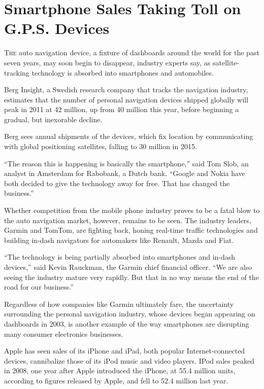﻿\documentclass[12pt]{article}
\begin{document}
\section{Smartphone Sales Taking Toll on G.P.S. Devices}

\lettrine{T}{he} auto navigation device, a fixture of dashboards around the
world for the past seven years, may soon begin to disappear, industry experts say, as
satellite-tracking technology is absorbed into smartphones and automobiles.

Berg Insight, a Swedish research company that tracks the navigation industry, estimates that the
number of personal navigation devices shipped globally will peak in 2011 at 42 million, up from 40
million this year, before beginning a gradual, but inexorable decline.

Berg sees annual shipments of the devices, which fix location by communicating with global
positioning satellites, falling to 30 million in 2015.

``The reason this is happening is basically the smartphone,'' said Tom Slob, an analyst in Amsterdam
for Rabobank, a Dutch bank. ``Google and Nokia have both decided to give the technology away for
free. That has changed the business.''

Whether competition from the mobile phone industry proves to be a fatal blow to the auto navigation
market, however, remains to be seen. The industry leaders, Garmin and TomTom, are fighting back,
honing real-time traffic technologies and building in-dash navigators for automakers like Renault,
Mazda and Fiat.

``The technology is being partially absorbed into smartphones and in-dash devices,'' said Kevin
Rauckman, the Garmin chief financial officer. ``We are also seeing the industry mature very rapidly.
But that in no way means the end of the road for our business.''

Regardless of how companies like Garmin ultimately fare, the uncertainty surrounding the personal
navigation industry, whose devices began appearing on dashboards in 2003, is another example of the
way smartphones are disrupting many consumer electronics businesses.

Apple has seen sales of its iPhone and iPad, both popular Internet-connected devices, cannibalize
those of its iPod music and video players. IPod sales peaked in 2008, one year after Apple
introduced the iPhone, at 55.4 million units, according to figures released by Apple, and fell to
52.4 million last year.
\end{document}

